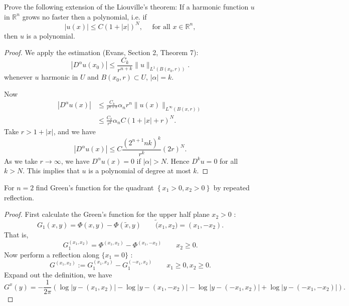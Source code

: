 
\begin{problem}
	Prove the following extension of the Liouville's theorem: If a harmonic function $u$ in $\mathbb{R}^n$ grows no faster then a polynomial, i.e. if
\[
|u(x)| \leq C(1+|x|)^N, \quad \text { for all } x \in \mathbb{R}^n,
\]
then $u$ is a polynomial.
\end{problem}
\begin{proof}
	We apply the estimation (Evans, Section 2, Theorem 7):
	\[
		\left| D^\alpha u(x_0) \right| 
		\le \frac{C_k}{r^{n+k}} \|u\|_{L^1(B(x_0, r))}
	.\] 
	whenever  $u$ harmonic in $U$ and $B(x_0, r) \subset U$, $|\alpha| = k$.

	Now
	\begin{align*}
		\left| D^\alpha u (x) \right| 
		&\leq \frac{C_k}{r^{n +k}}  \alpha_n r^n \|u(x)\|_{L^\infty (B(x, r))} \\
		&\leq \frac{C_k}{r^{k}}  \alpha_n C (1 + |x| + r)^N 
	.\end{align*}
	Take $r > 1 + |x|$, and we have
	\[
		|D^\alpha u(x)| \le C \frac{(2 ^{n+1} n k )^k}{r^k} (2 r)^N
	.\] 
	As we take $r \to \infty $, we have $D^\alpha u(x) = 0$ if $|\alpha| > N$. Hence $D^k u = 0$ for all $k > N$. This implies that $u $ is a polynomial of degree at most $k$.
\end{proof}

\begin{problem}
	For $n=2$ find Green's function for the quadrant $\left\{x_1>0, x_2>0\right\}$ by repeated reflection.
\end{problem}
\begin{proof}
	First calculate the Green's function for the upper half plane $x_2 > 0$ :
	\[
		G_1(x,y) = \Phi(x, y) - \Phi(\tilde x, y) \qquad
		\tilde (x_1, x_2) = (x_1,-x_2)
	.\] 
	That is,
	\[
		G_1^{(x_1,x_2)} = \Phi^{(x_1, x_2)} - \Phi^{(x_1, - x_2)} \qquad x_2 \ge 0
	.\] 
	Now perform a reflection along $\{x_1 = 0\} $ :
	\[
		G^{(x_1,x_2)} := G_1^{(x_1, x_2)} - G_1^{(- x_1, x_2)} \qquad x_1\ge 0, x_2\ge 0
	.\] 
	Expand out the definition, we have
	\[
		G^x(y) = - \frac{1}{2 \pi} \left( 
		\log|y - (x_1, x_2)| - \log|y - (x_1, -x_2)| - \log| y - (-x_1, x_2)| + \log|y - (-x_1, -x_2)| \right) 
	.\] 
\end{proof}

